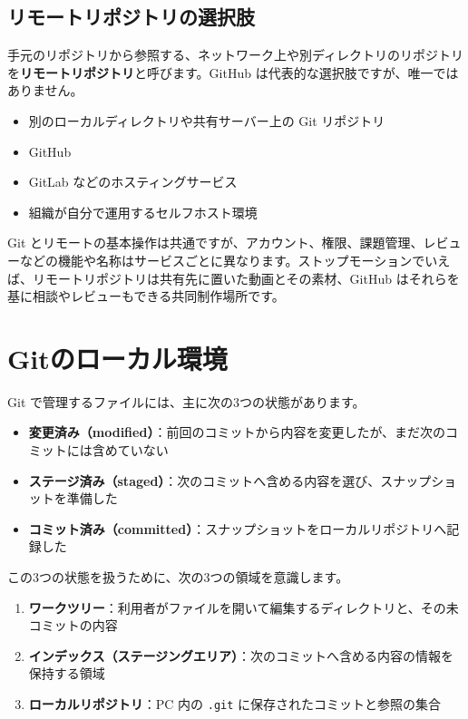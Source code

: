 \documentclass[a4paper,11pt]{jlreq}
\newcommand{\cmd}[1]{\texttt{#1}}
\newcommand{\term}[1]{\textbf{#1}}
\begin{document}
\subsection{リモートリポジトリの選択肢}

手元のリポジトリから参照する、ネットワーク上や別ディレクトリのリポジトリを\term{リモートリポジトリ}と呼びます。GitHub は代表的な選択肢ですが、唯一ではありません。

\begin{itemize}
  \item 別のローカルディレクトリや共有サーバー上の Git リポジトリ
  \item GitHub
  \item GitLab などのホスティングサービス
  \item 組織が自分で運用するセルフホスト環境
\end{itemize}

Git とリモートの基本操作は共通ですが、アカウント、権限、課題管理、レビューなどの機能や名称はサービスごとに異なります。ストップモーションでいえば、リモートリポジトリは共有先に置いた動画とその素材、GitHub はそれらを基に相談やレビューもできる共同制作場所です。

\section{Gitのローカル環境}

Git で管理するファイルには、主に次の3つの状態があります。

\begin{itemize}
  \item \term{変更済み（modified）}：前回のコミットから内容を変更したが、まだ次のコミットには含めていない
  \item \term{ステージ済み（staged）}：次のコミットへ含める内容を選び、スナップショットを準備した
  \item \term{コミット済み（committed）}：スナップショットをローカルリポジトリへ記録した
\end{itemize}

この3つの状態を扱うために、次の3つの領域を意識します。

\begin{enumerate}
  \item \term{ワークツリー}：利用者がファイルを開いて編集するディレクトリと、その未コミットの内容
  \item \term{インデックス（ステージングエリア）}：次のコミットへ含める内容の情報を保持する領域
  \item \term{ローカルリポジトリ}：PC 内の \cmd{.git} に保存されたコミットと参照の集合
\end{enumerate}
\end{document}

